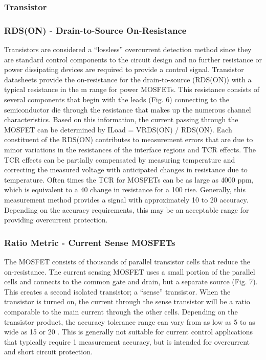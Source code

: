 \documentclass[12pt,a4paper,titlepage,openany]{report}
\begin{document}
\subsubsection{Transistor}
\subsubsection{RDS(ON) - Drain-to-Source On-Resistance}
Transistors are considered a “lossless” overcurrent detection method since they are standard control components to the circuit
design and no further resistance or power dissipating devices are required to provide a control signal. Transistor datasheets
provide the on-resistance for the drain-to-source (RDS(ON)) with a typical resistance in the m range for power MOSFETs. This
resistance consists of several components that begin with the leads (Fig. 6) connecting to the semiconductor die through the
resistance that makes up the numerous channel characteristics. Based on this information, the current passing through the
MOSFET can be determined by ILoad = VRDS(ON) / RDS(ON).
Each constituent of the RDS(ON) contributes to measurement errors that are due to minor variations in the resistances of the
interface regions and TCR effects. The TCR effects can be partially compensated by measuring temperature and correcting the
measured voltage with anticipated changes in resistance due to temperature. Often times the TCR for MOSFETs can be as large
as 4000 ppm, which is equivalent to a 40  change in resistance for a 100  rise. Generally, this measurement method
provides a signal with approximately 10  to 20  accuracy. Depending on the accuracy requirements, this may be an
acceptable range for providing overcurrent protection.

\subsubsection{Ratio Metric - Current Sense MOSFETs}
The MOSFET consists of thousands of parallel transistor cells that reduce the on-resistance. The current sensing MOSFET uses
a small portion of the parallel cells and connects to the common gate and drain, but a separate source (Fig. 7). This creates a
second isolated transistor; a “sense” transistor. When the transistor is turned on, the current through the sense transistor will
be a ratio comparable to the main current through the other cells.
Depending on the transistor product, the accuracy tolerance range can vary from as low as 5  to as wide as 15  or 20 .
This is generally not suitable for current control applications that typically require 1  measurement accuracy, but is intended
for overcurrent and short circuit protection.
\end{document}
